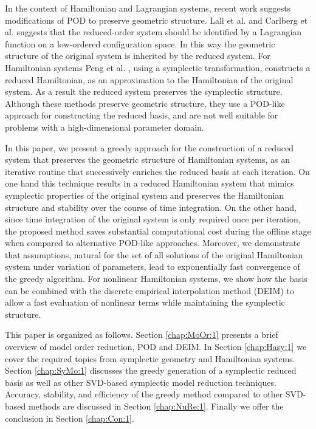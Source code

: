 In the context of Hamiltonian and Lagrangian systems, recent work suggests modifications of POD to preserve geometric structure. Lall et al. \cite{Lall:2003iy} and Carlberg et al. \cite{Carlberg:2014ky} suggests that the reduced-order system should be identified by a Lagrangian function on a low-ordered configuration space. In this way the geometric structure of the original system is inherited by the reduced system. For Hamiltonian systems Peng et al. \cite{Peng:2014di}, using a symplectic transformation, constructs a reduced Hamiltonian, as an approximation to the Hamiltonian of the original system. As a result the reduced system preserves the symplectic structure. Although these methods preserve geometric structure, they use a POD-like approach for constructing the reduced basis, and are not well suitable for problems with a high-dimensional parameter domain.

In this paper, we present a greedy approach for the construction of a reduced system that preserves the geometric structure of Hamiltonian systems, as an iterative routine that successively enriches the reduced basis at each iteration. On one hand this technique results in a reduced Hamiltonian system that mimics symplectic properties of the original system and preserves the Hamiltonian structure and stability over the course of time integration. On the other hand, since time integration of the original system is only required once per iteration, the proposed method saves substantial computational cost during the offline stage when compared to alternative POD-like approaches. Moreover, we demonstrate that assumptions, natural for the set of all solutions of the original Hamiltonian system under variation of parameters, lead to exponentially fast convergence of the greedy algorithm. For nonlinear Hamiltonian systems, we show how the basis can be combined with the discrete empirical interpolation method (DEIM) to allow a fast evaluation of nonlinear terms while maintaining the symplectic structure.

This paper is organized as follows. Section \ref{chap:MoOr:1} presents a brief overview of model order reduction, POD and DEIM. In Section \ref{chap:Hasy:1} we cover the required topics from symplectic geometry and Hamiltonian systems. Section \ref{chap:SyMo:1} discusses the greedy generation of a symplectic reduced basis as well as other SVD-based symplectic model reduction techniques. Accuracy, stability, and efficiency of the greedy method compared to other SVD-based methods are discussed in Section \ref{chap:NuRe:1}. Finally we offer the conclusion in Section \ref{chap:Con:1}.
